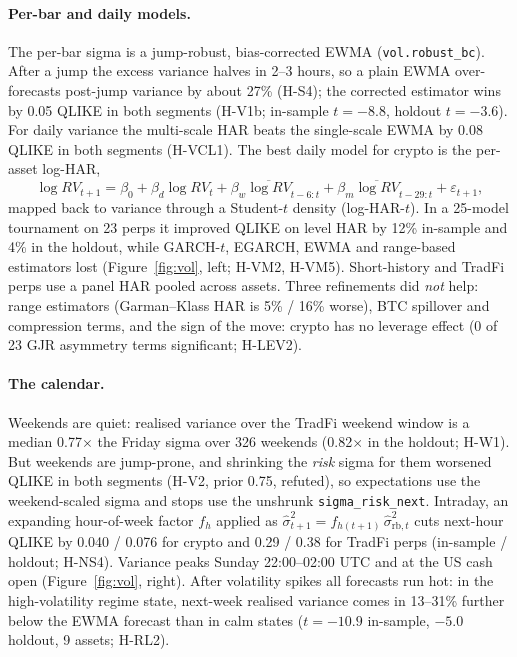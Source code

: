 \documentclass[10pt,a4paper]{article}
\newcommand{\hyp}[1]{\textsf{#1}}
\begin{document}
\paragraph{Per-bar and daily models.} The per-bar sigma is a jump-robust, bias-corrected EWMA (\texttt{vol.robust\_bc}). After a jump the excess variance halves in 2--3 hours, so a plain EWMA over-forecasts post-jump variance by about 27\% (\hyp{H-S4}); the corrected estimator wins by 0.05 QLIKE \citep{patton2011} in both segments (\hyp{H-V1b}; in-sample $t=-8.8$, holdout $t=-3.6$). For daily variance the multi-scale HAR \citep{corsi2009} beats the single-scale EWMA by 0.08 QLIKE in both segments (\hyp{H-VCL1}). The best daily model for crypto is the per-asset log-HAR,
\begin{equation}
\log RV_{t+1} = \beta_0 + \beta_d \log RV_t + \beta_w \overline{\log RV}_{t-6:t} + \beta_m \overline{\log RV}_{t-29:t} + \varepsilon_{t+1},
\end{equation}
mapped back to variance through a Student-$t$ density (log-HAR-$t$). In a 25-model tournament on 23 perps it improved QLIKE on level HAR by 12\% in-sample and 4\% in the holdout, while GARCH-$t$, EGARCH, EWMA and range-based estimators lost (Figure~\ref{fig:vol}, left; \hyp{H-VM2}, \hyp{H-VM5}). Short-history and TradFi perps use a panel HAR pooled across assets. Three refinements did \emph{not} help: range estimators (Garman--Klass HAR is 5\% / 16\% worse), BTC spillover and compression terms, and the sign of the move: crypto has no leverage effect (0 of 23 GJR asymmetry terms significant; \hyp{H-LEV2}).

\paragraph{The calendar.} Weekends are quiet: realised variance over the TradFi weekend window is a median 0.77$\times$ the Friday sigma over 326 weekends (0.82$\times$ in the holdout; \hyp{H-W1}). But weekends are jump-prone, and shrinking the \emph{risk} sigma for them worsened QLIKE in both segments (\hyp{H-V2}, prior 0.75, refuted), so expectations use the weekend-scaled sigma and stops use the unshrunk \texttt{sigma\_risk\_next}. Intraday, an expanding hour-of-week factor $f_h$ applied as $\hat\sigma^2_{t+1} = f_{h(t+1)}\,\hat\sigma^2_{\text{rb},t}$ cuts next-hour QLIKE by 0.040 / 0.076 for crypto and 0.29 / 0.38 for TradFi perps (in-sample / holdout; \hyp{H-NS4}). Variance peaks Sunday 22:00--02:00 UTC and at the US cash open (Figure~\ref{fig:vol}, right). After volatility spikes all forecasts run hot: in the high-volatility regime state, next-week realised variance comes in 13--31\% further below the EWMA forecast than in calm states ($t=-10.9$ in-sample, $-5.0$ holdout, 9 assets; \hyp{H-RL2}).
\end{document}
